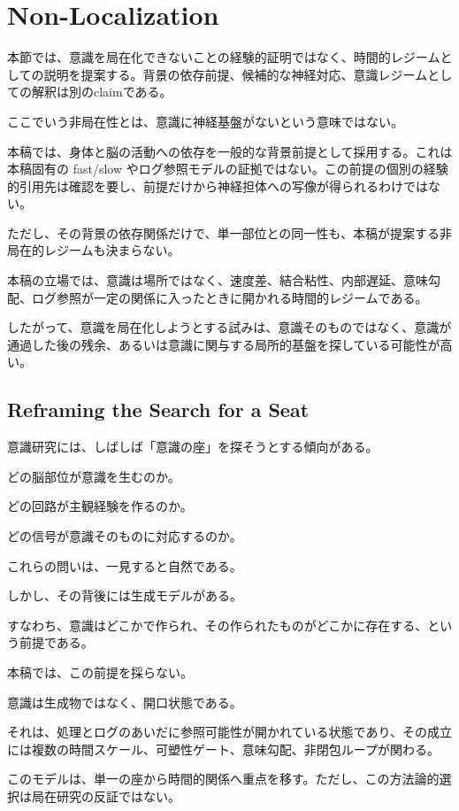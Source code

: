 \section{Non-Localization}


本節では、意識を局在化できないことの経験的証明ではなく、時間的レジームとしての説明を提案する。背景の依存前提、候補的な神経対応、意識レジームとしての解釈は別のclaimである。

ここでいう非局在性とは、意識に神経基盤がないという意味ではない。

本稿では、身体と脳の活動への依存を一般的な背景前提として採用する。これは本稿固有の fast/slow やログ参照モデルの証拠ではない。この前提の個別の経験的引用先は確認を要し、前提だけから神経担体への写像が得られるわけではない。

ただし、その背景の依存関係だけで、単一部位との同一性も、本稿が提案する非局在的レジームも決まらない。

本稿の立場では、意識は場所ではなく、速度差、結合粘性、内部遅延、意味勾配、ログ参照が一定の関係に入ったときに開かれる時間的レジームである。

したがって、意識を局在化しようとする試みは、意識そのものではなく、意識が通過した後の残余、あるいは意識に関与する局所的基盤を探している可能性が高い。

\subsection{Reframing the Search for a Seat}

意識研究には、しばしば「意識の座」を探そうとする傾向がある。

どの脳部位が意識を生むのか。

どの回路が主観経験を作るのか。

どの信号が意識そのものに対応するのか。

これらの問いは、一見すると自然である。

しかし、その背後には生成モデルがある。

すなわち、意識はどこかで作られ、その作られたものがどこかに存在する、という前提である。

本稿では、この前提を採らない。

意識は生成物ではなく、開口状態である。

それは、処理とログのあいだに参照可能性が開かれている状態であり、その成立には複数の時間スケール、可塑性ゲート、意味勾配、非閉包ループが関わる。

このモデルは、単一の座から時間的関係へ重点を移す。ただし、この方法論的選択は局在研究の反証ではない。

